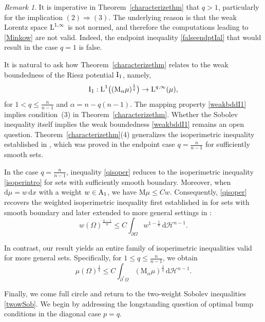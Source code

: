 \documentclass[11pt, a4paper, reqno]{amsart}
\newcommand{\A}{\textup A}
\newcommand{\al}{\alpha}
\newcommand{\Lup}{\textup{L}}
\theoremstyle{definition}
\theoremstyle{remark}
\newtheorem{remark}[theorem]{Remark}
\begin{document}
\begin{remark}
It is imperative in Theorem~\ref{characterizethm} that $q>1$, particularly for the implication $(2)\Rightarrow(3)$.  
The underlying reason is that the weak Lorentz space $\Lup^{1,\infty}$ is not normed, and therefore the computations leading to \eqref{Minkow} are not valid.  
Indeed, the endpoint inequality \eqref{falseendptIal} that would result in the case $q=1$ is false.

It is natural to ask how Theorem~\ref{characterizethm} relates to the weak boundedness of the Riesz potential $\textup{I}_1$, namely,
\begin{equation}\label{weakbddI1}
\textup{I}_1 : \Lup^{1}\big((\textup M_\al\mu)^{\frac1q}\big) \to \Lup^{q,\infty}(\mu),
\end{equation}
for $1<q\leq \frac{n}{n-1}$ and $\al = n - q(n-1)$.  
The mapping property \eqref{weakbddI1} implies condition~(3) in Theorem~\ref{characterizethm}.  
Whether the Sobolev inequality itself implies the weak boundedness \eqref{weakbddI1} remains an open question.
Theorem~\ref{characterizethm}(4) generalizes the isoperimetric inequality established in \cite{PR2}, which was proved in the endpoint case \( q = \tfrac{n}{n-1} \) for sufficiently smooth sets. 

In the case \( q = \frac{n}{n-1} \), inequality \eqref{qisoper} reduces to the isoperimetric inequality \eqref{isoperintro} for sets with sufficiently smooth boundary. Moreover, when \( \mathrm d\mu = w\,\mathrm dx \) with a weight \( w \in \A_1 \), we have \( \mathrm M\mu \leq C w \). Consequently, \eqref{qisoper} recovers the weighted isoperimetric inequality first established in \cite{DS} for sets with smooth boundary and later extended to more general settings in \cite[Section 2.4]{Tur}:
\[
w(\Omega)^{\frac{n-1}{n}}
\leq
C \int_{\partial \Omega} w^{1-\frac{1}{n}} \,\mathrm d\mathcal H^{n-1}.
\]

In contrast, our result yields an entire family of isoperimetric inequalities valid for more general sets. Specifically, for \( 1 \leq q \leq \frac{n}{n-1} \), we obtain
\[
\mu(\Omega)^{\frac{1}{q}}
\leq
C \int_{\partial^* \Omega} (\mathrm M_\alpha \mu)^{\frac{1}{q}} \, \mathrm d\mathcal H^{n-1}.
\]
\end{remark}

Finally, we come full circle and return to the two-weight Sobolev inequalities \eqref{twowSob}. 
We begin by addressing the longstanding question of optimal bump conditions in the diagonal 
case $p=q$. 
\end{document}
